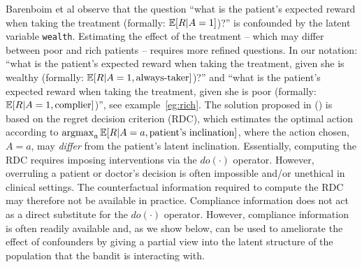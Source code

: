 Barenboim et al observe that the question ``what is the patient's expected reward when taking the treatment (formally: $\operatorname*{\mathbb E}[R|{A=1}]$)?'' is confounded by the latent variable \texttt{wealth}. Estimating the effect of the treatment -- which may differ between poor and rich patients -- requires more refined questions. In our notation: 
``what is the patient's expected reward when taking the treatment, given she is wealthy (formally: $\operatorname*{\mathbb E}[R|{A=1}, \text{always-taker}]$)?'' and  ``what is the patient's expected reward when taking the treatment, given she is poor (formally: $\operatorname*{\mathbb E}[R|{A=1}, \text{complier}]$)'', see example~\ref{eg:rich}.
The solution proposed in (\cite{bareinboim:15}) is based on the regret decision criterion (RDC), which estimates the optimal action according to $\operatorname*{argmax}_{a}\operatorname*{\mathbb E}[R|A=a,\text{patient's inclination}]$, where the action chosen, $A=a$, may \emph{differ} from the patient's latent inclination. Essentially, computing the RDC requires imposing interventions via the $do(\cdot)$ operator. However, overruling a patient or doctor's decision is often impossible and/or unethical in clinical settings. The counterfactual information required to compute the RDC may therefore not be available in practice.
Compliance information does not act as a direct substitute for the $do(\cdot)$ operator. However, compliance information is often readily available and, as we show below, can be used to ameliorate the effect of confounders by giving a partial view into the latent structure of the population that the bandit is interacting with.





